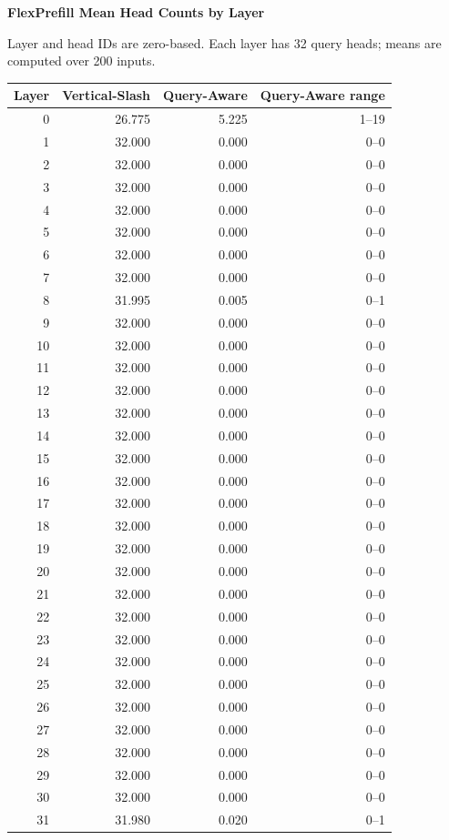 \documentclass[11pt,a4paper]{article}
\renewcommand{\arraystretch}{1.12}
\begin{document}
\newpage
\begin{center}
  {\Large\bfseries FlexPrefill Mean Head Counts by Layer}
\end{center}
Layer and head IDs are zero-based. Each layer has 32 query heads;
means are computed over 200 inputs.

\begin{center}
\renewcommand{\arraystretch}{1.02}
\begin{tabular}{@{}rrrr@{}}
\toprule
\textbf{Layer} & \textbf{Vertical-Slash} & \textbf{Query-Aware} & \textbf{Query-Aware range} \\
\midrule
0 & 26.775 & 5.225 & 1--19 \\
1 & 32.000 & 0.000 & 0--0 \\
2 & 32.000 & 0.000 & 0--0 \\
3 & 32.000 & 0.000 & 0--0 \\
4 & 32.000 & 0.000 & 0--0 \\
5 & 32.000 & 0.000 & 0--0 \\
6 & 32.000 & 0.000 & 0--0 \\
7 & 32.000 & 0.000 & 0--0 \\
8 & 31.995 & 0.005 & 0--1 \\
9 & 32.000 & 0.000 & 0--0 \\
10 & 32.000 & 0.000 & 0--0 \\
11 & 32.000 & 0.000 & 0--0 \\
12 & 32.000 & 0.000 & 0--0 \\
13 & 32.000 & 0.000 & 0--0 \\
14 & 32.000 & 0.000 & 0--0 \\
15 & 32.000 & 0.000 & 0--0 \\
16 & 32.000 & 0.000 & 0--0 \\
17 & 32.000 & 0.000 & 0--0 \\
18 & 32.000 & 0.000 & 0--0 \\
19 & 32.000 & 0.000 & 0--0 \\
20 & 32.000 & 0.000 & 0--0 \\
21 & 32.000 & 0.000 & 0--0 \\
22 & 32.000 & 0.000 & 0--0 \\
23 & 32.000 & 0.000 & 0--0 \\
24 & 32.000 & 0.000 & 0--0 \\
25 & 32.000 & 0.000 & 0--0 \\
26 & 32.000 & 0.000 & 0--0 \\
27 & 32.000 & 0.000 & 0--0 \\
28 & 32.000 & 0.000 & 0--0 \\
29 & 32.000 & 0.000 & 0--0 \\
30 & 32.000 & 0.000 & 0--0 \\
31 & 31.980 & 0.020 & 0--1 \\
\bottomrule
\end{tabular}
\end{center}
\end{document}
